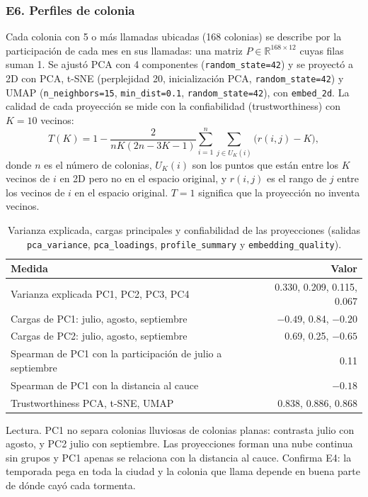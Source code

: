 \documentclass[11pt]{article}
\newcommand{\cod}[1]{\nolinkurl{#1}}
\begin{document}
\FloatBarrier
\subsubsection*{E6. Perfiles de colonia}

Cada colonia con 5 o más llamadas ubicadas (168 colonias) se describe por la participación de cada mes en sus llamadas: una matriz $P\in\mathbb{R}^{168\times 12}$ cuyas filas suman 1. Se ajustó PCA con 4 componentes (\cod{random_state=42}) y se proyectó a 2D con PCA, t-SNE \cite{vandermaaten2008} (perplejidad 20, inicialización PCA, \cod{random_state=42}) y UMAP \cite{mcinnes2018} (\cod{n_neighbors=15}, \cod{min_dist=0.1}, \cod{random_state=42}), con \cod{embed_2d}. La calidad de cada proyección se mide con la confiabilidad (trustworthiness) con $K=10$ vecinos:
\[ T(K)=1-\frac{2}{nK(2n-3K-1)}\sum_{i=1}^{n}\sum_{j\in U_K(i)}\bigl(r(i,j)-K\bigr), \]
donde $n$ es el número de colonias, $U_K(i)$ son los puntos que están entre los $K$ vecinos de $i$ en 2D pero no en el espacio original, y $r(i,j)$ es el rango de $j$ entre los vecinos de $i$ en el espacio original. $T=1$ significa que la proyección no inventa vecinos.

\begin{table}[!htbp]
  \centering
  \small
  \caption{Varianza explicada, cargas principales y confiabilidad de las proyecciones (salidas \cod{pca_variance}, \cod{pca_loadings}, \cod{profile_summary} y \cod{embedding_quality}).}
  \label{tab:e6}
  \begin{tabular}{lr}
    \toprule
    Medida & Valor \\
    \midrule
    Varianza explicada PC1, PC2, PC3, PC4 & 0.330, 0.209, 0.115, 0.067 \\
    Cargas de PC1: julio, agosto, septiembre & $-0.49$, 0.84, $-0.20$ \\
    Cargas de PC2: julio, agosto, septiembre & 0.69, 0.25, $-0.65$ \\
    Spearman de PC1 con la participación de julio a septiembre & 0.11 \\
    Spearman de PC1 con la distancia al cauce & $-0.18$ \\
    Trustworthiness PCA, t-SNE, UMAP & 0.838, 0.886, 0.868 \\
    \bottomrule
  \end{tabular}
\end{table}

Lectura. PC1 no separa colonias lluviosas de colonias planas: contrasta julio con agosto, y PC2 julio con septiembre. Las proyecciones forman una nube continua sin grupos y PC1 apenas se relaciona con la distancia al cauce. Confirma E4: la temporada pega en toda la ciudad y la colonia que llama depende en buena parte de dónde cayó cada tormenta.
\end{document}

